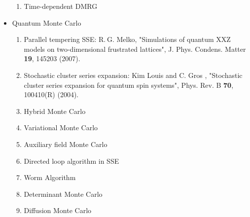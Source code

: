 \documentclass[12pt]{article}
\begin{document}
\begin{itemize}
\begin{enumerate}
\item Time-dependent DMRG
\end{enumerate}
\item Quantum Monte Carlo
\begin{enumerate}
\item Parallel tempering SSE: R. G. Melko, "Simulations of quantum XXZ models on two-dimensional frustrated lattices", J. Phys. Condens. Matter \textbf{19}, 145203 (2007).
\item Stochastic cluster series expansion: Kim Louis and C. Gros , "Stochastic cluster series expansion for quantum spin systems", Phys. Rev. B \textbf{70}, 100410(R) (2004).
\item Hybrid Monte Carlo
\item Variational Monte Carlo
\item Auxiliary field Monte Carlo
\item Directed loop algorithm in SSE
\item Worm Algorithm
\item Determinant Monte Carlo
\item Diffusion Monte Carlo

\end{enumerate}
\end{itemize}
\end{document}
